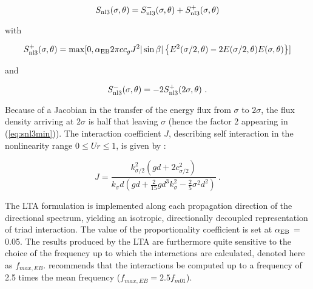 \begin{equation}
   S_{\rm nl3} (\sigma,\theta) = S^-_{\rm nl3} (\sigma,\theta) + S^+_{\rm nl3} (\sigma,\theta)
   \label{eq:snl3}
\end{equation}

with

\begin{equation}
  S^+_{\rm nl3} (\sigma,\theta) = \max [0,\alpha_{\rm EB} 2 \pi c c_g J^2 |\sin\beta| \left \{ E^2(\sigma/2,\theta) - 
  2 E(\sigma/2,\theta) E(\sigma,\theta) \right \}]
  \label{eq:snl3plu}
\end{equation}

and

\begin{equation}
  S^-_{\rm nl3} (\sigma,\theta) = -2 S^+_{\rm nl3} (2\sigma,\theta)\ .
  \label{eq:snl3min}
\end{equation}

Because of a Jacobian in the transfer of the energy flux from $\sigma$ to $2 
\sigma$, the flux density arriving at $2 \sigma$ is half that leaving 
$\sigma$ (hence the factor 2 appearing in (\ref{eq:snl3min})). The interaction coefficient 
$J$, describing self interaction in the nonlinearity range $0 \leq Ur \leq 1$, 
is given by \citep{art:MS93}:

\begin{equation}
   J = \frac{k^2_{\sigma/2} (gd + 2 c^2_{\sigma/2})}
      {k_\sigma d (gd + \frac{2}{15} gd^3 k^2_\sigma - \frac{2}{5} \sigma^2 d^2)}\ .
   \label{eq:intcoef}
\end{equation}

The LTA formulation is implemented along each propagation direction of 
the directional spectrum, yielding an isotropic, directionally decoupled 
representation of triad interaction. The value of the proportionality 
coefficient is set at $\alpha_{\rm EB}$ = 0.05. The results produced by 
the LTA are furthermore quite sensitive to the choice of the frequency up 
to which the interactions are calculated, denoted here as $f_{max,EB}$. 
\citep{rep:Eld95} recommends that the interactions be computed 
up to a frequency of 2.5 times the mean frequency ($f_{max,EB} = 
2.5 f_{m01}$).
